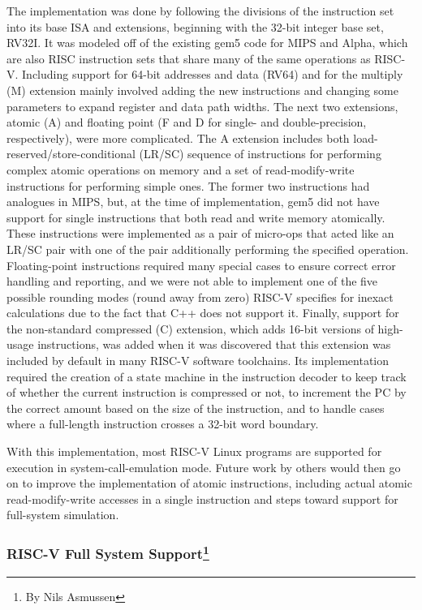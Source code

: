 The implementation was done by following the divisions of the instruction set into its base ISA and extensions, beginning with the 32-bit integer base set, RV32I.
It was modeled off of the existing gem5 code for MIPS and Alpha, which are also RISC instruction sets that share many of the same operations as RISC-V.
Including support for 64-bit addresses and data (RV64) and for the multiply (M) extension mainly involved adding the new instructions and changing some parameters to expand register and data path widths.
The next two extensions, atomic (A) and floating point (F and D for single- and double-precision, respectively), were more complicated.
The A extension includes both load-reserved/store-conditional (LR/SC) sequence of instructions for performing complex atomic operations on memory and a set of read-modify-write instructions for performing simple ones.
The former two instructions had analogues in MIPS, but, at the time of implementation, gem5 did not have support for single instructions that both read and write memory atomically.
These instructions were implemented as a pair of micro-ops that acted like an LR/SC pair with one of the pair additionally performing the specified operation.
Floating-point instructions required many special cases to ensure correct error handling and reporting, and we were not able to implement one of the five possible rounding modes (round away from zero) RISC-V specifies for inexact calculations due to the fact that C++ does not support it.
Finally, support for the non-standard compressed (C) extension, which adds 16-bit versions of high-usage instructions, was added when it was discovered that this extension was included by default in many RISC-V software toolchains.
Its implementation required the creation of a state machine in the instruction decoder to keep track of whether the current instruction is compressed or not, to increment the PC by the correct amount based on the size of the instruction, and to handle cases where a full-length instruction crosses a 32-bit word boundary.

With this implementation, most RISC-V Linux programs are supported for execution in system-call-emulation mode.
Future work by others would then go on to improve the implementation of atomic instructions, including actual atomic read-modify-write accesses in a single instruction and steps toward support for full-system simulation.

\subsubsection[RISC-V Full System Support]{RISC-V Full System Support\footnote{By Nils Asmussen}}

